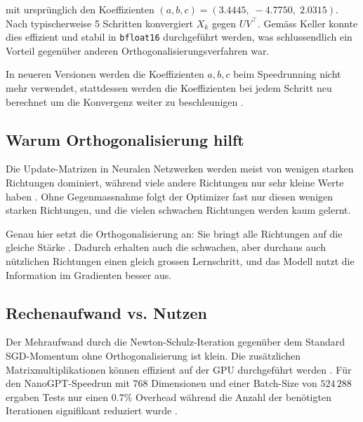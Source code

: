 mit ursprünglich den Koeffizienten $(a, b, c) = (3.4445,\; -4.7750,\; 2.0315)$.
Nach typischerweise 5 Schritten konvergiert $X_k$ gegen $UV^\top$.
Gemäss Keller \cite{keller_muon_2024} konnte dies effizient und stabil in \texttt{bfloat16} durchgeführt werden, was schlussendlich ein Vorteil gegenüber anderen Orthogonalisierungsverfahren war.

In neueren Versionen werden die Koeffizienten $a, b, c$ beim Speedrunning nicht mehr verwendet, stattdessen werden die Koeffizienten bei jedem Schritt neu berechnet um die Konvergenz weiter zu beschleunigen \cite{srivastava_muon_2024}.

\subsection*{Warum Orthogonalisierung hilft}

Die Update-Matrizen in Neuralen Netzwerken werden meist von wenigen starken Richtungen dominiert, während viele andere Richtungen nur sehr kleine Werte haben \cite{keller_muon_2024}.
Ohne Gegenmassnahme folgt der Optimizer fast nur diesen wenigen starken Richtungen, und die vielen schwachen Richtungen werden kaum gelernt.

Genau hier setzt die Orthogonalisierung an: Sie bringt alle Richtungen auf die gleiche Stärke \cite{keller_muon_2024}.
Dadurch erhalten auch die schwachen, aber durchaus auch nützlichen Richtungen einen gleich grossen Lernschritt, und das Modell nutzt die Information im Gradienten besser aus.

\subsection*{Rechenaufwand vs. Nutzen}

Der Mehraufwand durch die Newton-Schulz-Iteration gegenüber dem Standard SGD-Momentum ohne Orthogonalisierung ist klein. Die zusätzlichen Matrixmultiplikationen können effizient auf der GPU durchgeführt werden \cite{keller_muon_2024}. Für den NanoGPT-Speedrun mit $768$ Dimensionen und einer Batch-Size von $524\,288$ ergaben Tests nur einen $\mathbf{0.7\%}$ Overhead während die Anzahl der benötigten Iterationen signifikant reduziert wurde \cite{keller_muon_2024}.
